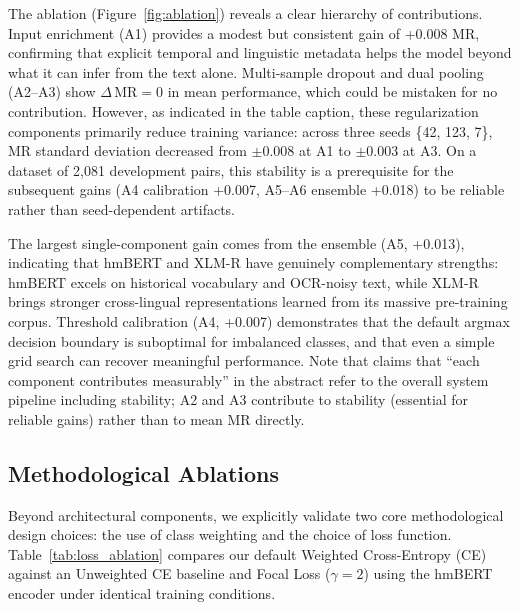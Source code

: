 \documentclass[11pt,a4paper]{article}
\begin{document}
The ablation (Figure~\ref{fig:ablation}) reveals a clear hierarchy of contributions. Input enrichment (A1) provides a modest but consistent gain of +0.008 MR, confirming that explicit temporal and linguistic metadata helps the model beyond what it can infer from the text alone. Multi-sample dropout and dual pooling (A2--A3) show $\Delta\,\text{MR}=0$ in mean performance, which could be mistaken for no contribution. However, as indicated in the table caption, these regularization components primarily reduce training variance: across three seeds \{42, 123, 7\}, MR standard deviation decreased from $\pm$0.008 at A1 to $\pm$0.003 at A3. On a dataset of 2{,}081 development pairs, this stability is a prerequisite for the subsequent gains (A4 calibration +0.007, A5--A6 ensemble +0.018) to be reliable rather than seed-dependent artifacts.

The largest single-component gain comes from the ensemble (A5, +0.013), indicating that hmBERT and XLM-R have genuinely complementary strengths: hmBERT excels on historical vocabulary and OCR-noisy text, while XLM-R brings stronger cross-lingual representations learned from its massive pre-training corpus. Threshold calibration (A4, +0.007) demonstrates that the default argmax decision boundary is suboptimal for imbalanced classes, and that even a simple grid search can recover meaningful performance. Note that claims that ``each component contributes measurably'' in the abstract refer to the overall system pipeline including stability; A2 and A3 contribute to stability (essential for reliable gains) rather than to mean MR directly.

\subsection{Methodological Ablations}
\label{sec:loss_ablation}

Beyond architectural components, we explicitly validate two core methodological design choices: the use of class weighting and the choice of loss function. Table~\ref{tab:loss_ablation} compares our default Weighted Cross-Entropy (CE) against an Unweighted CE baseline and Focal Loss ($\gamma=2$) using the hmBERT encoder under identical training conditions.
\end{document}
